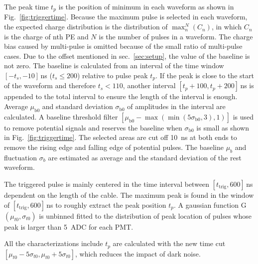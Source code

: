 The peak time $t_p$ is the position of minimum in each waveform as shown in Fig.~\ref{fig:triggertime}. Because the maximum pulse is selected in each waveform, the expected charge distribution is the distribution of $\max_n^N(C_n)$, in which $C_n$ is the charge of nth PE and $N$ is the number of pulses in a waveform. The charge bias caused by multi-pulse is omitted because of the small ratio of multi-pulse cases. Due to the offset mentioned in sec.~\ref{sec:setup}, the value of the baseline is not zero. The baseline is calculated from an interval of the time window $[-t_s,-10]$\,ns ($t_s\leq200$) relative to pulse peak $t_p$. If the peak is close to the start of the waveform and therefore $t_s < 110$, another interval $[t_p+100,t_p+200]$\,ns is appended to the total interval to ensure the length of the interval is enough. Average $\mu_{\mathrm{b0}}$ and standard deviation $\sigma_{\mathrm{b0}}$ of amplitudes in the interval are calculated. A baseline threshold filter $[\mu_{\mathrm{b0}}-\max(\min(5\sigma_{\mathrm{b0}},3),1)]$ is used to remove potential signals and reserves the baseline when $\sigma_{\mathrm{b0}}$ is small as shown in Fig.~\ref{fig:triggertime}. The selected areas are cut off \SI{10}{ns} at both ends to remove the rising edge and falling edge of potential pulses. The baseline $\mu_b$ and fluctuation $\sigma_b$ are estimated as average and the standard deviation of the rest waveform.

The triggered pulse is mainly centered in the time interval between $[t_{\mathrm{trig}}, 600]$\,ns dependent on the length of the cable. The maximum peak is found in the window of $[t_{\mathrm{trig}}, 600]$\,ns to roughly extract the peak position $t_p$. A gaussian function G$(\mu_{t0},\sigma_{t0})$ is unbinned fitted to the distribution of peak location of pulses whose peak is larger than \SI{5}{ADC} for each PMT.

All the characterizations include $t_p$ are calculated with the new time cut $[\mu_{t0}-5\sigma_{t0}, \mu_{t0}+5\sigma_{t0}]$, which reduces the impact of dark noise.

